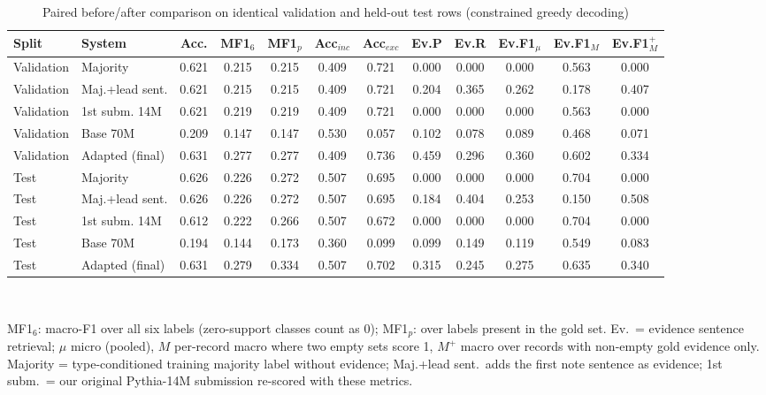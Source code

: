 \begin{table}[t]\centering\caption{Paired before/after comparison on identical validation and held-out test rows (constrained greedy decoding)}\label{tab:scores}\footnotesize
\begin{tabular}{llcccccccccc}
\hline
Split & System & Acc. & MF1$_6$ & MF1$_p$ & Acc$_{inc}$ & Acc$_{exc}$ & Ev.P & Ev.R & Ev.F1$_\mu$ & Ev.F1$_M$ & Ev.F1$_M^{+}$\\\hline
Validation & Majority & 0.621 & 0.215 & 0.215 & 0.409 & 0.721 & 0.000 & 0.000 & 0.000 & 0.563 & 0.000\\
Validation & Maj.+lead sent. & 0.621 & 0.215 & 0.215 & 0.409 & 0.721 & 0.204 & 0.365 & 0.262 & 0.178 & 0.407\\
Validation & 1st subm. 14M & 0.621 & 0.219 & 0.219 & 0.409 & 0.721 & 0.000 & 0.000 & 0.000 & 0.563 & 0.000\\
Validation & Base 70M & 0.209 & 0.147 & 0.147 & 0.530 & 0.057 & 0.102 & 0.078 & 0.089 & 0.468 & 0.071\\
Validation & Adapted (final) & 0.631 & 0.277 & 0.277 & 0.409 & 0.736 & 0.459 & 0.296 & 0.360 & 0.602 & 0.334\\
Test & Majority & 0.626 & 0.226 & 0.272 & 0.507 & 0.695 & 0.000 & 0.000 & 0.000 & 0.704 & 0.000\\
Test & Maj.+lead sent. & 0.626 & 0.226 & 0.272 & 0.507 & 0.695 & 0.184 & 0.404 & 0.253 & 0.150 & 0.508\\
Test & 1st subm. 14M & 0.612 & 0.222 & 0.266 & 0.507 & 0.672 & 0.000 & 0.000 & 0.000 & 0.704 & 0.000\\
Test & Base 70M & 0.194 & 0.144 & 0.173 & 0.360 & 0.099 & 0.099 & 0.149 & 0.119 & 0.549 & 0.083\\
Test & Adapted (final) & 0.631 & 0.279 & 0.334 & 0.507 & 0.702 & 0.315 & 0.245 & 0.275 & 0.635 & 0.340\\
\hline\end{tabular}
\\[2pt]\parbox{0.95\linewidth}{\scriptsize MF1$_6$: macro-F1 over all six labels (zero-support classes count as 0); MF1$_p$: over labels present in the gold set. Ev.\ = evidence sentence retrieval; $\mu$ micro (pooled), $M$ per-record macro where two empty sets score 1, $M^{+}$ macro over records with non-empty gold evidence only. Majority = type-conditioned training majority label without evidence; Maj.+lead sent.\ adds the first note sentence as evidence; 1st subm.\ = our original Pythia-14M submission re-scored with these metrics.}
\end{table}

